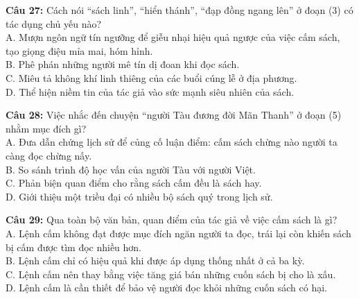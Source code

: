 \documentclass[12pt,a4paper]{article}
\begin{document}


\vspace{0.3cm}

\noindent \textbf{Câu 27:} Cách nói ``sách linh'', ``hiển thánh'', ``đạp đồng ngang lên'' ở đoạn (3) có tác dụng chủ yếu nào?\\
\noindent A. Mượn ngôn ngữ tín ngưỡng để giễu nhại hiệu quả ngược của việc cấm sách, tạo giọng điệu mỉa mai, hóm hỉnh.\\
\noindent B. Phê phán những người mê tín dị đoan khi đọc sách.\\
\noindent C. Miêu tả không khí linh thiêng của các buổi cúng lễ ở địa phương.\\
\noindent D. Thể hiện niềm tin của tác giả vào sức mạnh siêu nhiên của sách.



\vspace{0.3cm}

\noindent \textbf{Câu 28:} Việc nhắc đến chuyện ``người Tàu đương đời Mãn Thanh'' ở đoạn (5) nhằm mục đích gì?\\
\noindent A. Đưa dẫn chứng lịch sử để củng cố luận điểm: cấm sách chừng nào người ta càng đọc chừng nấy.\\
\noindent B. So sánh trình độ học vấn của người Tàu với người Việt.\\
\noindent C. Phản biện quan điểm cho rằng sách cấm đều là sách hay.\\
\noindent D. Giới thiệu một triều đại có nhiều bộ sách quý trong lịch sử.



\vspace{0.3cm}

\noindent \textbf{Câu 29:} Qua toàn bộ văn bản, quan điểm của tác giả về việc cấm sách là gì?\\
\noindent A. Lệnh cấm không đạt được mục đích ngăn người ta đọc, trái lại còn khiến sách bị cấm được tìm đọc nhiều hơn.\\
\noindent B. Lệnh cấm chỉ có hiệu quả khi được áp dụng thống nhất ở cả ba kỳ.\\
\noindent C. Lệnh cấm nên thay bằng việc tăng giá bán những cuốn sách bị cho là xấu.\\
\noindent D. Lệnh cấm là cần thiết để bảo vệ người đọc khỏi những cuốn sách có hại.



\vspace{0.3cm}
\end{document}

